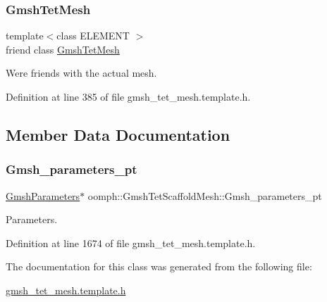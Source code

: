 \subsubsection{\texorpdfstring{Gmsh\+Tet\+Mesh}{GmshTetMesh}}
{\footnotesize\ttfamily template$<$class E\+L\+E\+M\+E\+NT $>$ \\
friend class \hyperlink{classoomph_1_1GmshTetMesh}{Gmsh\+Tet\+Mesh}\hspace{0.3cm}{\ttfamily [friend]}}



We\textquotesingle{}re friends with the actual mesh. 



Definition at line 385 of file gmsh\+\_\+tet\+\_\+mesh.\+template.\+h.



\subsection{Member Data Documentation}
\mbox{\label{classoomph_1_1GmshTetScaffoldMesh_afce3676b4f42501024ba1a933f04600d}} 
\subsubsection{\texorpdfstring{Gmsh\+\_\+parameters\+\_\+pt}{Gmsh\_parameters\_pt}}
{\footnotesize\ttfamily \hyperlink{classoomph_1_1GmshParameters}{Gmsh\+Parameters}$\ast$ oomph\+::\+Gmsh\+Tet\+Scaffold\+Mesh\+::\+Gmsh\+\_\+parameters\+\_\+pt\hspace{0.3cm}{\ttfamily [private]}}



Parameters. 



Definition at line 1674 of file gmsh\+\_\+tet\+\_\+mesh.\+template.\+h.



The documentation for this class was generated from the following file\+:\begin{DoxyCompactItemize}
\item 
\hyperlink{gmsh__tet__mesh_8template_8h}{gmsh\+\_\+tet\+\_\+mesh.\+template.\+h}\end{DoxyCompactItemize}
